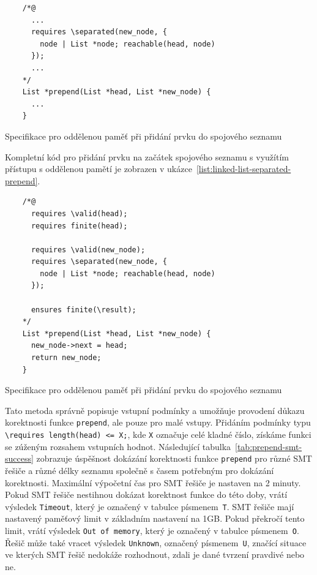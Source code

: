 \begin{listing}[H]
    \begin{verbatim}
    /*@
      ...
      requires \separated(new_node, {
        node | List *node; reachable(head, node)
      });
      ...
    */
    List *prepend(List *head, List *new_node) {
      ...
    }
    \end{verbatim}
    \caption{Specifikace pro oddělenou paměť při přidání prvku do spojového seznamu}
    \label{list:linked-list-axiom-prepend}
\end{listing}

Kompletní kód pro přidání prvku na začátek spojového seznamu
s využítím přístupu s oddělenou pamětí je zobrazen v ukázce~\ref{list:linked-list-separated-prepend}.

\begin{listing}[H]
    \begin{verbatim}
    /*@
      requires \valid(head);
      requires finite(head);

      requires \valid(new_node);
      requires \separated(new_node, {
        node | List *node; reachable(head, node)
      });

      ensures finite(\result);
    */
    List *prepend(List *head, List *new_node) {
      new_node->next = head;
      return new_node;
    }
    \end{verbatim}
    \caption{Specifikace pro oddělenou paměť při přidání prvku do spojového seznamu}
    \label{list:linked-list-separated-prepend}
\end{listing}

Tato metoda správně popisuje vstupní podmínky a umožňuje provodení důkazu korektnosti funkce \texttt{prepend},
ale pouze pro malé vstupy.
Přidáním podmínky typu \texttt{\textbackslash requires length(head) <= X;},
kde \texttt{X} označuje celé kladné číslo,
získáme funkci se zúženým rozsahem vstupních hodnot.
Následující tabulka~\ref{tab:prepend-smt-success} zobrazuje úspěšnost dokázání korektnosti funkce \texttt{prepend}
pro různé SMT řešiče a různé délky seznamu společně s časem potřebným pro dokázání korektnosti.
Maximální výpočetní čas pro SMT řešiče je nastaven na 2 minuty.
Pokud SMT řešiče nestihnou dokázat korektnost funkce do této doby,
vrátí výsledek \texttt{Timeout}, který je označený v tabulce písmenem~\texttt{T}.
SMT řešiče mají nastavený paměťový limit v základním nastavení na 1GB\@.
Pokud překročí tento limit, vrátí výsledek \texttt{Out of memory},
který je označený v tabulce písmenem~\texttt{O}.
Řešič může také vracet výsledek \texttt{Unknown}, označený písmenem~\texttt{U},
značící situace ve kterých SMT řešič nedokáže rozhodnout,
zdali je dané tvrzení pravdivé nebo ne.

